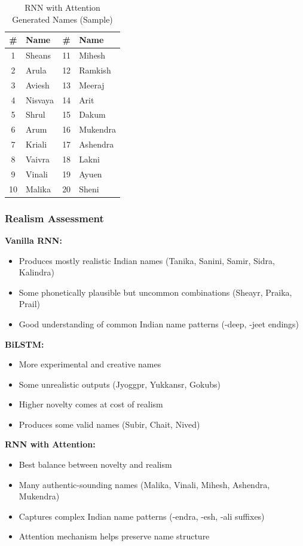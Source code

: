 \documentclass[12pt,a4paper]{article}
\begin{document}
\begin{table}[H]
\centering
\caption{RNN with Attention Generated Names (Sample)}
\begin{tabular}{@{}clcl@{}}
\toprule
\# & Name & \# & Name \\
\midrule
1 & Sheans & 11 & Mihesh \\
2 & Arula & 12 & Ramkish \\
3 & Aviesh & 13 & Meeraj \\
4 & Nisvaya & 14 & Arit \\
5 & Shrul & 15 & Dakum \\
6 & Arum & 16 & Mukendra \\
7 & Kriali & 17 & Ashendra \\
8 & Vaivra & 18 & Lakni \\
9 & Vinali & 19 & Ayuen \\
10 & Malika & 20 & Sheni \\
\bottomrule
\end{tabular}
\end{table}

\subsubsection{Realism Assessment}

\textbf{Vanilla RNN:}
\begin{itemize}
    \item Produces mostly realistic Indian names (Tanika, Sanini, Samir, Sidra, Kalindra)
    \item Some phonetically plausible but uncommon combinations (Sheayr, Praika, Prail)
    \item Good understanding of common Indian name patterns (-deep, -jeet endings)
\end{itemize}

\textbf{BiLSTM:}
\begin{itemize}
    \item More experimental and creative names
    \item Some unrealistic outputs (Jyoggpr, Yukkansr, Gokubs)
    \item Higher novelty comes at cost of realism
    \item Produces some valid names (Subir, Chait, Nived)
\end{itemize}

\textbf{RNN with Attention:}
\begin{itemize}
    \item Best balance between novelty and realism
    \item Many authentic-sounding names (Malika, Vinali, Mihesh, Ashendra, Mukendra)
    \item Captures complex Indian name patterns (-endra, -esh, -ali suffixes)
    \item Attention mechanism helps preserve name structure
\end{itemize}
\end{document}
